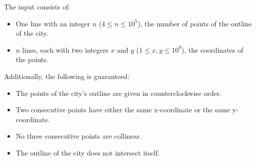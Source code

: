 
  The input consists of:
  \begin{itemize}
    \item One line with an integer $n$ ($4 \leq n \leq 10^5$), the number of points of the outline of the city.
    \item $n$ lines, each with two integers $x$ and $y$ ($1 \leq x,y \leq 10^9$), the coordinates of the points.
  \end{itemize}
  Additionally, the following is guaranteed:
  \begin{itemize}
    \item The points of the city's outline are given in counterclockwise order.
    \item Two consecutive points have either the same x-coordinate or the same y-coordinate.
    \item No three consecutive points are collinear.
    \item The outline of the city does not intersect itself.
  \end{itemize}
